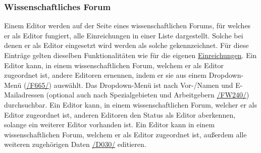 \subsubsection{Wissenschaftliches Forum} \label{ed:wissFor}
\begin{description}
     Einem Editor werden auf der Seite eines wissenschaftlichen Forums, für
    welches er als Editor fungiert, alle Einreichungen in einer Liste dargestellt.
    Solche bei denen er als Editor eingesetzt wird werden als solche gekennzeichnet.
    Für diese Einträge gelten dieselben Funktionalitäten wie für die
    eigenen \hyperref[nut:ein]{Einreichungen}.
     Ein Editor kann, in einem wissenschaftlichen Forum, welchem er als Editor zugeordnet ist,
    andere Editoren ernennen, indem er sie aus einem Dropdown-Menü (\hyperref[funkt:665]{/F665/}) auswählt.
     Das Dropdown-Menü ist nach Vor-/Namen und E-Mailadressen
    (optional auch nach Spezialgebieten und Arbeitgebern \hyperref[funkt:240]{/FW240/}) durchsuchbar.
     Ein Editor kann, in einem wissenschaftlichen Forum, welcher er als Editor zugeordnet ist,
    anderen Editoren den Status als Editor aberkennen, solange ein weiterer Editor vorhanden ist.
     Ein Editor kann in einem wissenschaftlichen Forum, welchem er als Editor zugeordnet ist,
    außerdem alle weiteren zugehörigen Daten \hyperref[d030]{/D030/} editieren.
\end{description}

